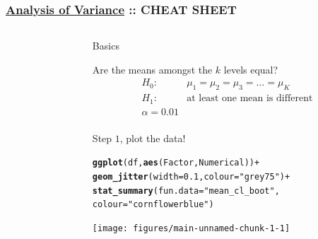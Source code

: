 \documentclass[final,9pt,fleqn]{beamer}\usepackage[]{graphicx}\usepackage[]{color}
\makeatletter
\newcommand{\hlnum}[1]{\textcolor[rgb]{0.686,0.059,0.569}{#1}}%
\newcommand{\hlstr}[1]{\textcolor[rgb]{0.192,0.494,0.8}{#1}}%
\newcommand{\hlopt}[1]{\textcolor[rgb]{0,0,0}{#1}}%
\newcommand{\hlstd}[1]{\textcolor[rgb]{0.345,0.345,0.345}{#1}}%
\newcommand{\hlkwc}[1]{\textcolor[rgb]{0.333,0.667,0.333}{#1}}%
\newcommand{\hlkwd}[1]{\textcolor[rgb]{0.737,0.353,0.396}{\textbf{#1}}}%
\newenvironment{kframe}{%
 \def\at@end@of@kframe{}%
 \ifinner\ifhmode%
  \def\at@end@of@kframe{\end{minipage}}%
  \begin{minipage}{\columnwidth}%
 \fi\fi%
 \def\FrameCommand##1{\hskip\@totalleftmargin \hskip-\fboxsep
 \colorbox{shadecolor}{##1}\hskip-\fboxsep
     \hskip-\linewidth \hskip-\@totalleftmargin \hskip\columnwidth}%
 \MakeFramed {\advance\hsize-\width
   \@totalleftmargin\z@ \linewidth\hsize
   \@setminipage}}%
 {\par\unskip\endMakeFramed%
 \at@end@of@kframe}
\newenvironment{knitrout}{}{} %
\makeatother
\begin{document}
\begin{frame}[fragile]
  \frametitle{ \underline{Analysis of Variance} :: {\Large \textbf{CHEAT SHEET}} }
  \hspace{0.1in}
  \begin{columns}

    \begin{column}{0.03\paperwidth}
    \end{column}

    \begin{column}{0.3\paperwidth}
      \begin{block}{{\huge Basics}}

        Are the means amongst the $k$ levels equal? \\
        \vspace{-0.1in}
        \begin{align*}
          H_0: \quad  & \mu_1 = \mu_2 = \mu_3 = \ldots = \mu_K \\
          H_1: \quad  & \text{at least one mean is different} \\
          \alpha = 0.01 &  \\
        \end{align*}
      \end{block}
      \vspace{-0.25in}
      Step $1$, plot the data!
      \vspace{-0.1in}


\begin{knitrout}
\color{fgcolor}\begin{kframe}
\begin{alltt}
\hlkwd{ggplot}\hlstd{(df,} \hlkwd{aes}\hlstd{(Factor, Numerical))} \hlopt{+}
    \hlkwd{geom_jitter}\hlstd{(}\hlkwc{width}\hlstd{=}\hlnum{0.1}\hlstd{,} \hlkwc{colour}\hlstd{=}\hlstr{"grey75"}\hlstd{)} \hlopt{+}
    \hlkwd{stat_summary}\hlstd{(}\hlkwc{fun.data}\hlstd{=}\hlstr{"mean_cl_boot"}\hlstd{,}
                 \hlkwc{colour}\hlstd{=}\hlstr{"cornflowerblue"}\hlstd{)}
\end{alltt}
\end{kframe}
\texttt{[image: figures/main-unnamed-chunk-1-1]} 

\end{knitrout}


\end{column}
\end{columns}
\end{frame}
\end{document}
